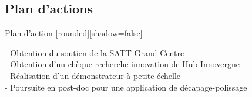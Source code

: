 \documentclass[french]{beamer}
\begin{document}
%
%

%


\subsection{Plan d'actions}
\begin{frame}{Plan d'action} %
[rounded][shadow=false]
{\small %

\begin{block}{} %
- Obtention du soutien de la SATT Grand Centre\\
- Obtention d'un chèque recherche-innovation de Hub Innovergne\\
- Réalisation d'un démonstrateur à petite échelle\\
- Poursuite en post-doc pour une application de décapage-polissage
\end{block}
}
\end{frame}
\end{document}
